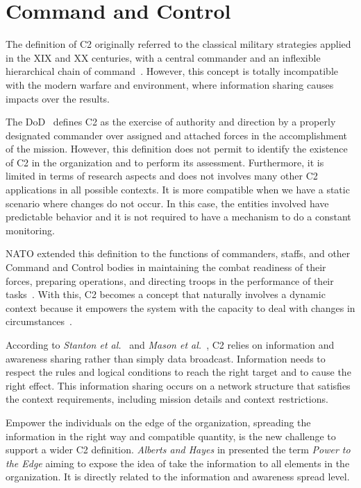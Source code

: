 
\section{Command and Control}

The definition of C2 originally referred to the classical military strategies applied in the XIX and XX centuries, with a central commander and an inflexible hierarchical chain of command~\cite{Alberts2006}. However, this concept is totally incompatible with the modern warfare and environment, where information sharing causes impacts over the results.

The \gls{DoD}~\cite{dod01} defines C2 as the exercise of authority and direction by a properly designated commander over assigned and attached forces in the accomplishment of the mission. However, this definition does not permit to identify the existence of C2 in the organization and to perform its assessment. Furthermore, it is limited in terms of research aspects and does not involves many other C2 applications in all possible contexts. It is more compatible when we have a static scenario where changes do not occur. In this case, the entities involved have predictable behavior and it is not required to have a mechanism to do a constant monitoring. 

NATO extended this definition to the functions of commanders, staffs, and other Command and Control bodies in maintaining the combat readiness of their forces, preparing operations, and directing troops in the performance of their tasks~\cite{FRANCE2014}. With this, C2 becomes a concept that naturally involves a dynamic context because it empowers the system with the capacity to deal with changes in circumstances~\cite{Power01}.

According to \textit{Stanton et al.}~\cite{Stanton2007} and \textit{Mason et al.}~\cite{Mason2001}, C2 relies on information and awareness sharing rather than simply data broadcast. Information needs to respect the rules and logical conditions to reach the right target and to cause the right effect. This information sharing occurs on a network structure that satisfies the context requirements, including mission details and context restrictions. 

Empower the individuals on the edge of the organization, spreading the information in the right way and compatible quantity, is the new challenge to support a wider C2 definition. \textit{Alberts and Hayes} in \cite{Power01} presented the term \textit{Power to the Edge} aiming to expose the idea of take the information to all elements in the organization. It is directly related to the information and awareness spread level.

